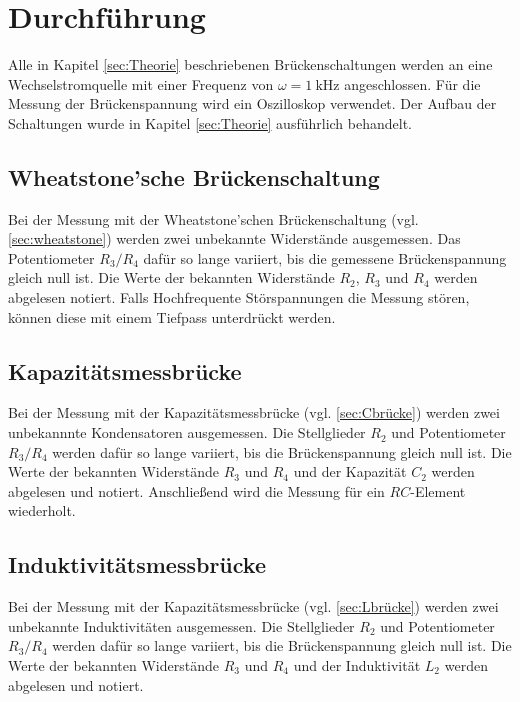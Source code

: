 \section{Durchführung}
\label{sec:Durchführung}
Alle in Kapitel \ref{sec:Theorie} beschriebenen Brückenschaltungen werden an eine Wechselstromquelle mit einer Frequenz von 
$\omega=\SI{1}{\kilo\hertz}$ angeschlossen. Für die Messung der Brückenspannung wird ein Oszilloskop verwendet. Der Aufbau der 
Schaltungen wurde in Kapitel \ref{sec:Theorie} ausführlich behandelt. 

\subsection{Wheatstone'sche Brückenschaltung}
\label{sec:durch-wheatstone}
Bei der Messung mit der Wheatstone'schen Brückenschaltung (vgl. \ref{sec:wheatstone}) werden zwei unbekannte Widerstände ausgemessen.
Das Potentiometer $R_3/R_4$ dafür so lange variiert, bis die gemessene Brückenspannung gleich null ist. 
Die Werte der bekannten Widerstände $R_2$, $R_3$ und $R_4$ werden abgelesen notiert.
Falls Hochfrequente Störspannungen die Messung stören, können diese mit einem Tiefpass unterdrückt werden. 

\subsection{Kapazitätsmessbrücke}
\label{sec:durch-Cbrücke}
Bei der Messung mit der Kapazitätsmessbrücke (vgl. \ref{sec:Cbrücke}) werden zwei unbekannnte Kondensatoren ausgemessen. 
Die Stellglieder $R_2$ und Potentiometer $R_3/R_4$ werden dafür so lange variiert, bis die Brückenspannung gleich null ist.
Die Werte der bekannten Widerstände $R_3$ und $R_4$ und der Kapazität $C_2$ werden abgelesen und notiert. 
Anschließend wird die Messung für ein $RC$-Element wiederholt.

\subsection{Induktivitätsmessbrücke}
\label{sec:durch-Lbrücke}
Bei der Messung mit der Kapazitätsmessbrücke (vgl. \ref{sec:Lbrücke}) werden zwei unbekannte Induktivitäten ausgemessen. 
Die Stellglieder $R_2$ und Potentiometer $R_3/R_4$ werden dafür so lange variiert, bis die Brückenspannung gleich null ist.
Die Werte der bekannten Widerstände $R_3$ und $R_4$ und der Induktivität $L_2$ werden abgelesen und notiert.

